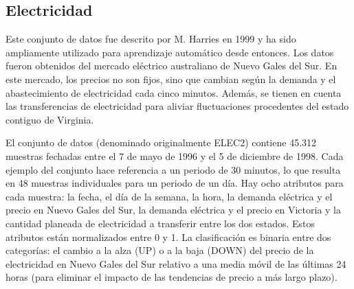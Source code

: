 \subsection{Electricidad}
\label{subsec:dataset-electricity}

Este conjunto de datos fue descrito por M. Harries \cite{electricity-dataset} en 1999 y ha sido ampliamente utilizado para aprendizaje automático desde entonces. Los datos fueron obtenidos del mercado eléctrico australiano de Nuevo Gales del Sur. En este mercado, los precios no son fijos, sino que cambian según la demanda y el abastecimiento de electricidad cada cinco minutos. Además, se tienen en cuenta las transferencias de electricidad para aliviar fluctuaciones procedentes del estado contiguo de Virginia.

El conjunto de datos (denominado originalmente ELEC2) contiene 45.312 muestras fechadas entre el 7 de mayo de 1996 y el 5 de diciembre de 1998. Cada ejemplo del conjunto hace referencia a un periodo de 30 minutos, lo que resulta en 48 muestras individuales para un periodo de un día. Hay ocho atributos para cada muestra: la fecha, el día de la semana, la hora, la demanda eléctrica y el precio en Nuevo Gales del Sur, la demanda eléctrica y el precio en Victoria y la cantidad planeada de electricidad a transferir entre los dos estados. Estos atributos están normalizados entre 0 y 1. La clasificación es binaria entre dos categorías: el cambio a la alza (UP) o a la baja (DOWN) del precio de la electricidad en Nuevo Gales del Sur relativo a una media móvil de las últimas 24 horas (para eliminar el impacto de las tendencias de precio a más largo plazo). 

